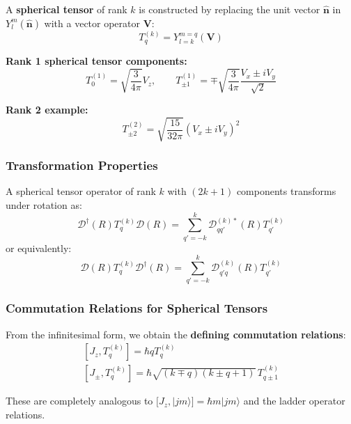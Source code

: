 \documentclass[11pt,a4paper]{article}
\begin{document}
A \textbf{spherical tensor} of rank $k$ is constructed by replacing the unit vector $\hat{\mathbf{n}}$ in $Y_l^m(\hat{\mathbf{n}})$ with a vector operator $\mathbf{V}$:
\begin{equation}
T_q^{(k)} = Y_{l=k}^{m=q}(\mathbf{V})
\tag{3.458}
\end{equation}

\textbf{Rank 1 spherical tensor components:}
\begin{equation}
\boxed{T_0^{(1)} = \sqrt{\frac{3}{4\pi}}V_z, \qquad T_{\pm 1}^{(1)} = \mp\sqrt{\frac{3}{4\pi}}\frac{V_x \pm iV_y}{\sqrt{2}}}
\tag{3.459}
\end{equation}

\textbf{Rank 2 example:}
\begin{equation}
T_{\pm 2}^{(2)} = \sqrt{\frac{15}{32\pi}}(V_x \pm iV_y)^2
\tag{3.460}
\end{equation}

\subsubsection{Transformation Properties}

A spherical tensor operator of rank $k$ with $(2k+1)$ components transforms under rotation as:
\begin{equation}
\boxed{\mathscr{D}^\dagger(R)T_q^{(k)}\mathscr{D}(R) = \sum_{q'=-k}^{k}\mathscr{D}_{qq'}^{(k)*}(R)T_{q'}^{(k)}}
\tag{3.465a}
\end{equation}
or equivalently:
\begin{equation}
\mathscr{D}(R)T_q^{(k)}\mathscr{D}^\dagger(R) = \sum_{q'=-k}^{k}\mathscr{D}_{q'q}^{(k)}(R)T_{q'}^{(k)}
\tag{3.465b}
\end{equation}

\subsubsection{Commutation Relations for Spherical Tensors}

From the infinitesimal form, we obtain the \textbf{defining commutation relations}:
\begin{align}
\boxed{[J_z, T_q^{(k)}] = \hbar q T_q^{(k)}} \tag{3.468a} \\[6pt]
\boxed{[J_\pm, T_q^{(k)}] = \hbar\sqrt{(k \mp q)(k \pm q + 1)}\, T_{q\pm 1}^{(k)}} \tag{3.468b}
\end{align}

These are completely analogous to $[J_z, |jm\rangle] = \hbar m|jm\rangle$ and the ladder operator relations.
\end{document}
